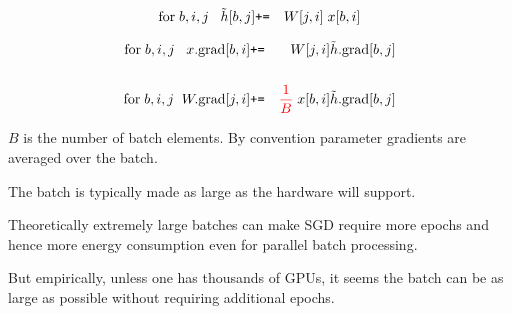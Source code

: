{
\vspace{-3ex}
\begin{eqnarray*}
  \mathrm{for}\;b,i,j\;\;\;\tilde{h}[b,j] & \mbox{\tt +=} & W[j,i]\;x[b,i]
\end{eqnarray*}

\begin{eqnarray*}
\mathrm{for}\;b,i,j\;\;\;  x.\mathrm{grad}[b,i] & \mbox{\tt +=} & W[j,i]\tilde{h}.\mathrm{grad}[b,j] \\
  \\
\mathrm{for}\;b,i,j\;\;  W.\mathrm{grad}[j,i] & \mbox{\tt +=} & {\color{red} \frac{1}{B}}\;x[b,i]\tilde{h}.\mathrm{grad}[b,j]
\end{eqnarray*}

\vfill
$B$ is the number of batch elements.  By convention parameter gradients are averaged over the batch.


The batch is typically made as large as the hardware will support.

\vfill
Theoretically extremely large batches can make SGD require more epochs and hence more energy consumption even for parallel batch processing.

\vfill
But empirically, unless one has thousands of GPUs, it seems the batch can be as large as possible without requiring additional epochs.
}


